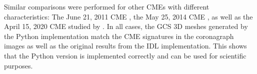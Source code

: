 Similar comparisons were performed for other CMEs with different characteristics: The June 21, 2011 CME \citep[originally reconstructed by][Table 1]{Heinemann-2019}, the May 25, 2014 CME \citep[originally reconstructed by][Figure 5b]{Dumbovic2018-ForbMod}, as well as the April 15, 2020 CME studied by \citet{Forstner-2021-SolO}. In all cases, the GCS 3D meshes generated by the Python implementation match the CME signatures in the coronagraph images as well as the original results from the IDL implementation. This shows that the Python version is implemented correctly and can be used for scientific purposes.
